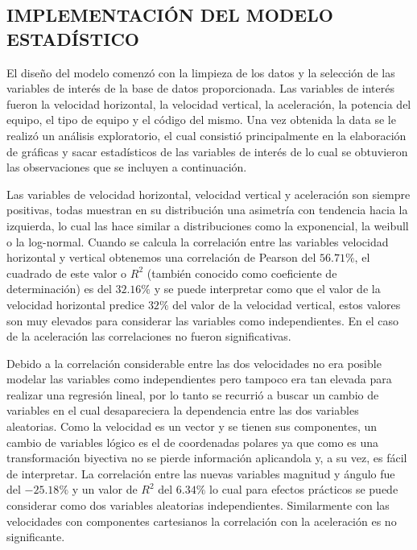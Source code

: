 \subsection{IMPLEMENTACIÓN DEL MODELO ESTADÍSTICO}

El diseño del modelo comenzó con la limpieza de los datos y la selección de las
variables de interés de la base de datos proporcionada. Las variables de
interés fueron la velocidad horizontal, la velocidad vertical, la aceleración,
la potencia del equipo, el tipo de equipo y el código del mismo. Una vez
obtenida la data se le realizó un análisis exploratorio, el cual
consistió principalmente en la elaboración de gráficas y sacar estadísticos de
las variables de interés de lo cual se obtuvieron las observaciones que se incluyen
a continuación.

Las variables de velocidad horizontal, velocidad vertical y aceleración son
siempre positivas, todas muestran en su distribución una asimetría con
tendencia hacia la izquierda, lo cual las hace similar a distribuciones como la
exponencial, la weibull o la log-normal. Cuando se calcula la correlación entre
las variables velocidad horizontal y vertical obtenemos una
correlación de Pearson del $56.71\%$, el cuadrado de este valor o $R^2$ (también
conocido como coeficiente de determinación) es del $32.16\%$ y se puede
interpretar como que el valor de la velocidad horizontal predice $32\%$ del valor
de la velocidad vertical, estos valores son muy elevados para considerar las
variables como independientes. En el caso de la aceleración las correlaciones
no fueron significativas.

Debido a la correlación considerable entre las dos velocidades no era posible
modelar las variables como independientes pero tampoco era tan elevada para
realizar una regresión lineal, por lo tanto se recurrió a buscar un cambio de
variables en el cual desapareciera la dependencia entre las dos variables
aleatorias. Como la velocidad es un vector y se tienen sus componentes,
un cambio de variables lógico es el de coordenadas polares ya que como es
una transformación biyectiva no se pierde información aplicandola y, a
su vez, es fácil de interpretar. La correlación entre las nuevas variables
magnitud y ángulo fue del $-25.18\%$ y un valor de $R^2$ del $6.34\%$ lo cual para
efectos prácticos se puede considerar como dos variables aleatorias
independientes. Similarmente con las velocidades con componentes cartesianos la
correlación con la aceleración es no significante.

